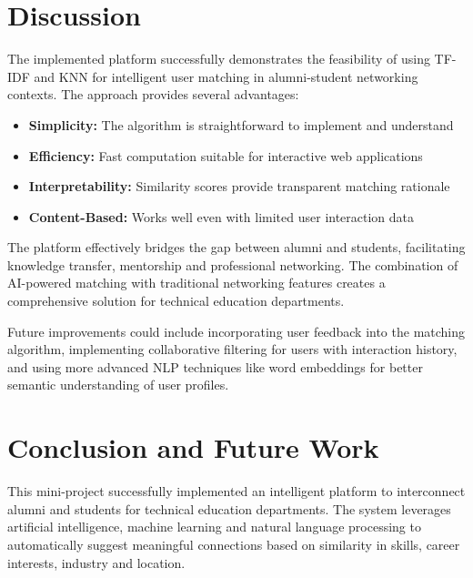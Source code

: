 \documentclass[12pt,a4paper]{report}
\let\origsection\section
\renewcommand{\section}{\needspace{4\baselineskip}\origsection}
\begin{document}
\section{Discussion}

The implemented platform successfully demonstrates the feasibility of using TF-IDF and KNN for intelligent user matching in alumni-student networking contexts. The approach provides several advantages:

\begin{itemize}[noitemsep]
    \item \textbf{Simplicity:} The algorithm is straightforward to implement and understand
    \item \textbf{Efficiency:} Fast computation suitable for interactive web applications
    \item \textbf{Interpretability:} Similarity scores provide transparent matching rationale
    \item \textbf{Content-Based:} Works well even with limited user interaction data
\end{itemize}

\medskip

\noindent
The platform effectively bridges the gap between alumni and students, facilitating knowledge transfer, mentorship and professional networking. The combination of AI-powered matching with traditional networking features creates a comprehensive solution for technical education departments.

\medskip

\noindent
Future improvements could include incorporating user feedback into the matching algorithm, implementing collaborative filtering for users with interaction history, and using more advanced NLP techniques like word embeddings for better semantic understanding of user profiles.


\section{Conclusion and Future Work}

This mini-project successfully implemented an intelligent platform to interconnect alumni and students for technical education departments. The system leverages artificial intelligence, machine learning and natural language processing to automatically suggest meaningful connections based on similarity in skills, career interests, industry and location.
\end{document}
